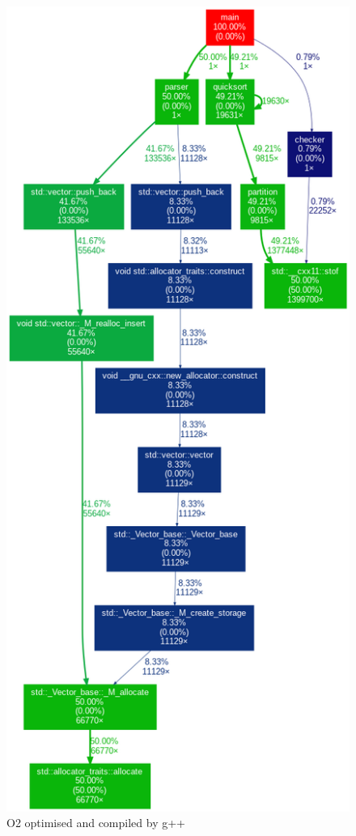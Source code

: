 \begin{figure}[H]
\begin{center}
\leavevmode
\includegraphics[width=350pt]{1sttry.png}
\caption{O2 optimised and compiled by g++}
\label{malloc}
\end{center}
\end{figure}


